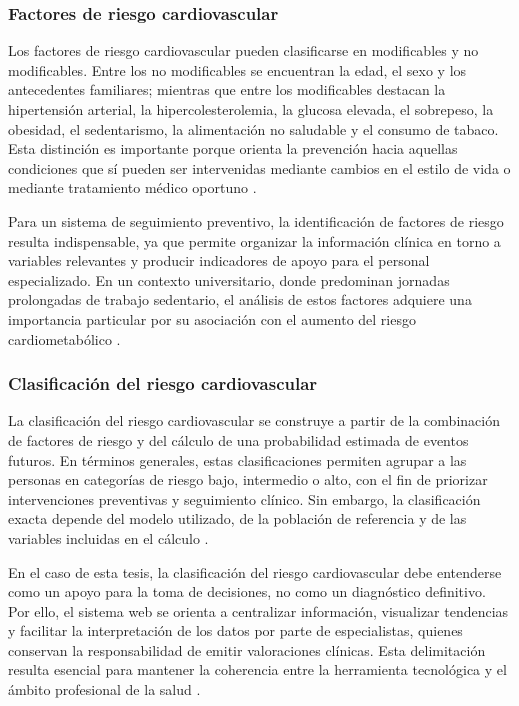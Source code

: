 \subsubsection{Factores de riesgo cardiovascular}

Los factores de riesgo cardiovascular pueden clasificarse en modificables y no modificables. Entre los no modificables se encuentran la edad, el sexo y los antecedentes familiares; mientras que entre los modificables destacan la hipertensión arterial, la hipercolesterolemia, la glucosa elevada, el sobrepeso, la obesidad, el sedentarismo, la alimentación no saludable y el consumo de tabaco. Esta distinción es importante porque orienta la prevención hacia aquellas condiciones que sí pueden ser intervenidas mediante cambios en el estilo de vida o mediante tratamiento médico oportuno \cite{who2025cvd}.

Para un sistema de seguimiento preventivo, la identificación de factores de riesgo resulta indispensable, ya que permite organizar la información clínica en torno a variables relevantes y producir indicadores de apoyo para el personal especializado. En un contexto universitario, donde predominan jornadas prolongadas de trabajo sedentario, el análisis de estos factores adquiere una importancia particular por su asociación con el aumento del riesgo cardiometabólico \cite{who2025cvd}.

\subsubsection{Clasificación del riesgo cardiovascular}

La clasificación del riesgo cardiovascular se construye a partir de la combinación de factores de riesgo y del cálculo de una probabilidad estimada de eventos futuros. En términos generales, estas clasificaciones permiten agrupar a las personas en categorías de riesgo bajo, intermedio o alto, con el fin de priorizar intervenciones preventivas y seguimiento clínico. Sin embargo, la clasificación exacta depende del modelo utilizado, de la población de referencia y de las variables incluidas en el cálculo \cite{aha2024prevent,who2025cvd}.

En el caso de esta tesis, la clasificación del riesgo cardiovascular debe entenderse como un apoyo para la toma de decisiones, no como un diagnóstico definitivo. Por ello, el sistema web se orienta a centralizar información, visualizar tendencias y facilitar la interpretación de los datos por parte de especialistas, quienes conservan la responsabilidad de emitir valoraciones clínicas. Esta delimitación resulta esencial para mantener la coherencia entre la herramienta tecnológica y el ámbito profesional de la salud \cite{who2025digitalhealth,mdn2025privacy}.

